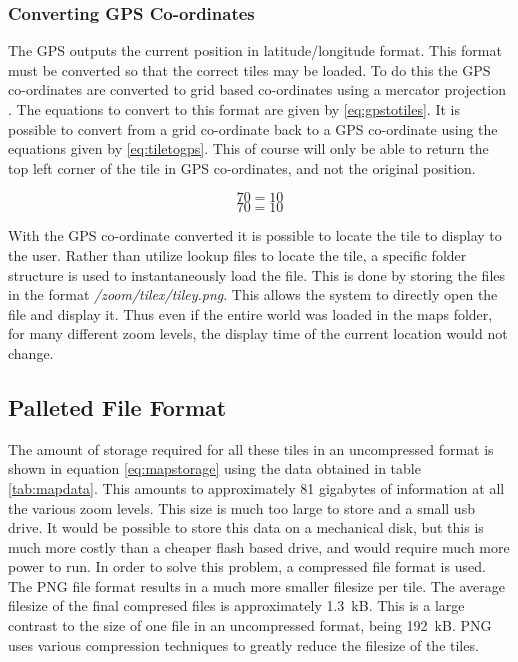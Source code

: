 
\subsubsection{Converting GPS Co-ordinates}

The GPS outputs the current position in latitude/longitude format. This format must be converted so that the correct tiles may be loaded. To do this the GPS co-ordinates are converted to grid based co-ordinates using a mercator projection \cite{slippy_map_tilenames}. The equations to convert to this format are given by \ref{eq:gpstotiles}. It is possible to convert from a grid co-ordinate back to a GPS co-ordinate using the equations given by \ref{eq:tiletogps}. This of course will only be able to return the top left corner of the tile in GPS co-ordinates, and not the original position.

\begin{equation}
\label{eq:gpstotiles}
70=10
\end{equation}
\begin{equation}
\label{eq:tilestogps}
70=10
\end{equation}

With the GPS co-ordinate converted it is possible to locate the tile to display to the user. Rather than utilize lookup files to locate the tile, a specific folder structure is used to instantaneously load the file. This is done by storing the files in the format \emph{/zoom/tilex/tiley.png}. This allows the system to directly open the file and display it. Thus even if the entire world was loaded in the maps folder, for many different zoom levels, the display time of the current location would not change.

\subsection{Palleted File Format}

The amount of storage required for all these tiles in an uncompressed format is shown in equation \ref{eq:mapstorage} using the data obtained in table \ref{tab:mapdata}. This amounts to approximately 81 gigabytes of information at all the various zoom levels. This size is much too large to store and a small usb drive. It would be possible to store this data on a mechanical disk, but this is much more costly than a cheaper flash based drive, and would require much more power to run.
In order to solve this problem, a compressed file format is used. The PNG file format results in a much more smaller filesize per tile. The average filesize of the final compresed files is approximately 1.3~kB. This is a large contrast to the size of one file in an uncompressed format, being 192~kB. PNG uses various compression techniques to greatly reduce the filesize of the tiles.

